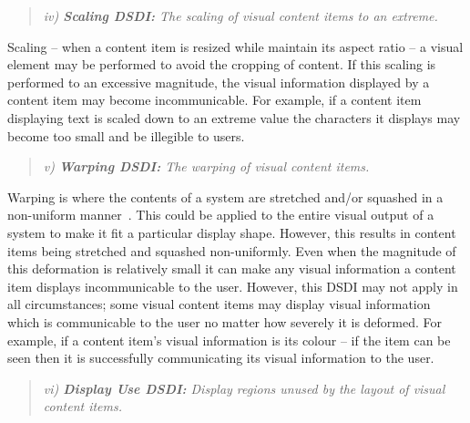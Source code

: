 \documentclass[twocolumn,compsoc]{cvm}
\begin{document}
\begin{quote}\emph{iv) \textbf{Scaling \ac{DSDI}:} The scaling of visual content items to an extreme.}\end{quote}

Scaling -- when a content item is resized while maintain its aspect ratio -- a visual element may be performed to avoid the cropping of content.
If this scaling is performed to an excessive magnitude, the visual information displayed by a content item may become incommunicable.
For example, if a content item displaying text is scaled down to an extreme value the characters it displays may become too small and be illegible to users.

\begin{quote}\emph{v) \textbf{Warping \ac{DSDI}:} The warping of visual content items.}\end{quote}

Warping is where the contents of a system are stretched and/or squashed in a non-uniform manner~\cite{Milliron2002}.
This could be applied to the entire visual output of a system to make it fit a particular display shape.
However, this results in content items being stretched and squashed non-uniformly.
Even when the magnitude of this deformation is relatively small it can make any visual information a content item displays incommunicable to the user.
However, this \ac{DSDI} may not apply in all circumstances; some visual content items may display visual information which is communicable to the user no matter how severely it is deformed.
For example, if a content item's visual information is its colour -- if the item can be seen then it is successfully communicating its visual information to the user.

\begin{quote}\emph{vi) \textbf{Display Use \ac{DSDI}:} Display regions unused by the layout of visual content items.}\end{quote}
\end{document}
